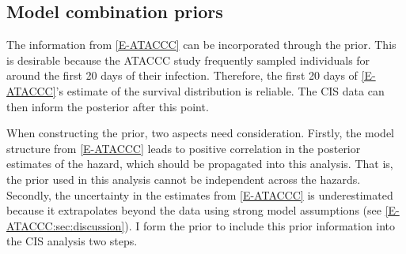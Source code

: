 \documentclass[thesis.tex]{subfiles}
\begin{document}
\subsection{Model combination priors} \label{perf-test:sec:informative-priors}

The information from \cref{E-ATACCC} can be incorporated through the prior.
This is desirable because the ATACCC study frequently sampled individuals for around the first 20 days of their infection.
Therefore, the first 20 days of \cref{E-ATACCC}'s estimate of the survival distribution is reliable.
The CIS data can then inform the posterior after this point.

When constructing the prior, two aspects need consideration.
Firstly, the model structure from \cref{E-ATACCC} leads to positive correlation in the posterior estimates of the hazard, which should be propagated into this analysis.
That is, the prior used in this analysis cannot be independent across the hazards.
Secondly, the uncertainty in the estimates from \cref{E-ATACCC} is underestimated because it extrapolates beyond the data using strong model assumptions (see \cref{E-ATACCC:sec:discussion}).
I form the prior to include this prior information into the CIS analysis two steps.
\end{document}
